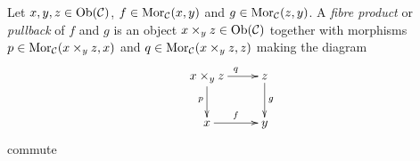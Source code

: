 \begin{frame}
\iftoggle{thmsty}{
\begin{definition}
\label{definition-fibre-products}
}{}
Let $x, y, z\in \mathop{\rm Ob}\nolimits(\mathcal{C})$,
$f\in \mathop{\rm Mor}\nolimits_\mathcal{C}(x, y)$
and $g\in \mathop{\rm Mor}\nolimits_{\mathcal C}(z, y)$.
A {\it fibre product} or {\it pullback} of $f$ and $g$ is
an object $x \times_y z\in \mathop{\rm Ob}\nolimits(\mathcal{C})$
together with morphisms
$p\in \mathop{\rm Mor}\nolimits_{\mathcal C}(x \times_y z, x)$ and
$q\in\mathop{\rm Mor}\nolimits_{\mathcal C}(x \times_y z, z)$ making the diagram
$$
\xymatrix{
x \times_y z \ar[r]^{q} \ar[d]_p
&
z \ar[d]^{g}
\\
x \ar[r]^{f}
&
y
}
$$
commute
\end{frame}